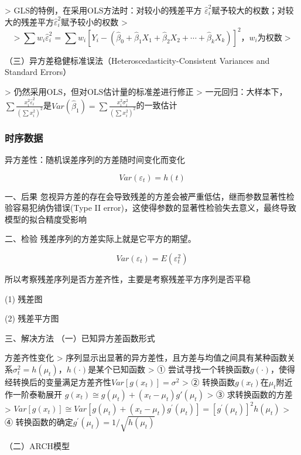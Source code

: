 \documentclass[12pt]{book}
\begin{document}
> GLS的特例，在采用OLS方法时：对较小的残差平方 $\hat{\varepsilon}_i^2$赋予较大的权数；对较大的残差平方$\hat{\varepsilon}_i^2$赋予较小的权数
> $$
> \sum{w_i \hat{\varepsilon}_i^2}=\sum{w_i\left[Y_i-(\hat{\beta}_0+\hat{\beta}_1 X_1 + \hat{\beta}_2 X_2 +\cdots+\hat{\beta}_k X_k)\right]^2}，w_i为权数
> $$

（三）异方差稳健标准误法（Heteroscedasticity-Consistent Variances and Standard Errors）

> 仍然采用OLS，但对OLS估计量的标准差进行修正  
> 一元回归：大样本下，$\sum{ \frac{x_i^2 \hat{\varepsilon}_i^2}{(\sum{x_i^2})^2}}$是$Var(\hat{\beta}_1) = \sum{ \frac{x_i^2 \sigma_i^2}{(\sum{x_i^2})^2}}$的一致估计










\subsubsection{时序数据}









异方差性：随机误差序列的方差随时间变化而变化

$$
Var(\varepsilon_t)=h(t)
$$

一、后果
忽视异方差的存在会导致残差的方差会被严重低估，继而参数显著性检验容易犯纳伪错误(Type II error)，这使得参数的显著性检验失去意义，最终导致模型的拟合精度受影响

二、检验
残差序列的方差实际上就是它平方的期望。

$$
Var(ε_t)=E(ε_t^2)
$$

所以考察残差序列是否方差齐性，主要是考察残差平方序列是否平稳

(1) 残差图

(2) 残差平方图

三、解决方法
（一）已知异方差函数形式

方差齐性变化
> 序列显示出显著的异方差性，且方差与均值之间具有某种函数关系$σ_t^2=h(μ_t)$，$h(⋅)$是某个已知函数  
> ① 尝试寻找一个转换函数$g(⋅)$，使得经转换后的变量满足方差齐性$Var[g(x_t)]=σ^2$  
> ② 转换函数$g(x_t)$在$\mu_t$附近作一阶泰勒展开 $g(x_{t}) ≅ g(\mu_t)+(x_{t} - \mu_{t} ) g' (\mu_t)$  
> ③ 求转换函数的方差  
> $Var[g(x_t)]≅Var[g(μ_t)+(x_t-μ_t)g^{'} (μ_t)]=[g^{'} (μ_t)]^2 h(μ_t)$  
> ④ 转换函数的确定$g^{'} (μ_t)=1/\sqrt{h(μ_t)}$

（二）ARCH模型
\end{document}
